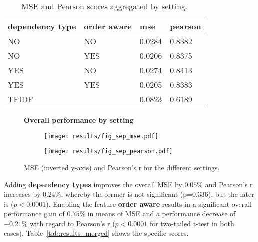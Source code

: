 \begin{table}[htb!]
  	\centering
 \begin{tabularx}{\textwidth}{|X X|X|X|}
		\hline
		dependency type & order aware & mse & pearson \\ \hline \hline
		NO & NO & 0.0284 & 0.8382 \\ 
		NO & YES & 0.0206 & 0.8375 \\
		YES & NO & 0.0274 & 0.8413 \\
		YES & YES & 0.0205 & 0.8383 \\ \hline \hline
		\multicolumn{2}{|l|}{TFIDF} & 0.0823 & 0.6189 \\ \hline
 \end{tabularx}
 \caption{MSE and Pearson scores aggregated by setting.}
 \label{tab:results}
\end{table}
	


\begin{figure}[htb!]
  \centering
  \textbf{Overall performance by setting}\par\medskip
  \begin{subfigure}{.5\textwidth}
    \centering
    \texttt{[image: results/fig\_sep\_mse.pdf]}
    \captionsetup{width=0.9\linewidth}
  \end{subfigure}%
  \begin{subfigure}{.5\textwidth}
    \centering
    \texttt{[image: results/fig\_sep\_pearson.pdf]}
    \captionsetup{width=0.9\linewidth}
  \end{subfigure}
  \caption{MSE (inverted y-axis) and Pearson's r for the different settings.}
  \label{fig:res_all}
\end{figure}

Adding \textbf{dependency types} improves the overall \ac{MSE} by $0.05\%$ and Pearson's r increases by $0.24\%$, whereby the former is not significant (p=0.336), but the later is ($p<0.0001$). Enabling the feature \textbf{order aware} results in a significant overall performance gain of $0.75\%$ in means of \ac{MSE} and a performance decrease of $-0.21\%$ with regard to Pearson's r ($p<0.0001$ for two-tailed t-test  in both cases). Table~\ref{tab:results_merged} shows the specific scores.

